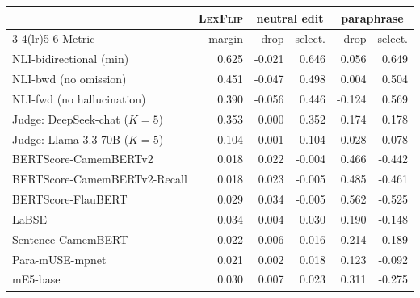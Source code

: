 \setlength{\tabcolsep}{3.5pt}
\begin{tabular}{lrrrrr}
\toprule
& \textsc{LexFlip} & \multicolumn{2}{c}{neutral edit} & \multicolumn{2}{c}{paraphrase} \\
\cmidrule(lr){3-4}\cmidrule(lr){5-6}
Metric & margin & drop & select. & drop & select. \\
\midrule
NLI-bidirectional (min) & 0.625 & -0.021 & 0.646 & 0.056 & 0.649 \\
NLI-bwd (no omission) & 0.451 & -0.047 & 0.498 & 0.004 & 0.504 \\
NLI-fwd (no hallucination) & 0.390 & -0.056 & 0.446 & -0.124 & 0.569 \\
Judge: DeepSeek-chat ($K{=}5$) & 0.353 & 0.000 & 0.352 & 0.174 & 0.178 \\
Judge: Llama-3.3-70B ($K{=}5$) & 0.104 & 0.001 & 0.104 & 0.028 & 0.078 \\
BERTScore-CamemBERTv2 & 0.018 & 0.022 & -0.004 & 0.466 & -0.442 \\
BERTScore-CamemBERTv2-Recall & 0.018 & 0.023 & -0.005 & 0.485 & -0.461 \\
BERTScore-FlauBERT & 0.029 & 0.034 & -0.005 & 0.562 & -0.525 \\
LaBSE & 0.034 & 0.004 & 0.030 & 0.190 & -0.148 \\
Sentence-CamemBERT & 0.022 & 0.006 & 0.016 & 0.214 & -0.189 \\
Para-mUSE-mpnet & 0.021 & 0.002 & 0.018 & 0.123 & -0.092 \\
mE5-base & 0.030 & 0.007 & 0.023 & 0.311 & -0.275 \\
\bottomrule
\end{tabular}
